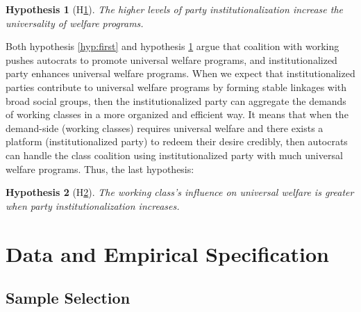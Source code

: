 \documentclass[12pt, letterpage, notitlepage]{article}
\newtheorem{hyp}{Hypothesis}
\begin{document}
\begin{hyp}[H\ref{hyp:second}] \label{hyp:second}
	The higher levels of party institutionalization increase the universality of welfare programs.
\end{hyp}

Both hypothesis \ref{hyp:first} and hypothesis \ref{hyp:second} argue that coalition with working pushes autocrats to promote universal welfare programs, and institutionalized party enhances universal welfare programs. When we expect that institutionalized parties contribute to universal welfare programs by forming stable linkages with broad social groups, then the institutionalized party can aggregate the demands of working classes in a more organized and efficient way. It means that when the demand-side (working classes) requires universal welfare and there exists a platform (institutionalized party) to redeem their desire credibly, then autocrats can handle the class coalition using institutionalized party with much universal welfare programs. Thus, the last hypothesis:

\begin{hyp}[H\ref{hyp:third}] \label{hyp:third}
	The working class's influence on universal welfare is greater when party institutionalization increases.
\end{hyp}

\section{Data and Empirical Specification}
\subsection{Sample Selection}
\end{document}
